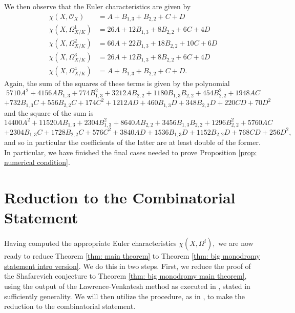 \documentclass{article}
\theoremstyle{definition}
\theoremstyle{remark}
\begin{document}
We then observe that the Euler characteristics are given by \begin{align*}
\chi(X, \mathcal{O}_X) & = A + B_{1, 3} + B_{2, 2} + C + D\\
\chi(X, \Omega^1_{X/K}) & = 26A + 12B_{1, 3} + 8B_{2, 2} + 6C + 4D\\
\chi(X, \Omega^2_{X/K}) & = 66A + 22B_{1, 3} + 18B_{2, 2} + 10C + 6D\\
\chi(X, \Omega^3_{X/K}) & = 26A + 12B_{1, 3} + 8B_{2, 2} + 6C + 4D\\
\chi(X, \Omega^4_{X/K}) & = A + B_{1, 3} + B_{2, 2} + C + D.
\end{align*}
Again, the sum of the squares of these terms is given by the polynomial $$5710A^2 + 4156AB_{1, 3} + 774B_{1, 3}^2 + 3212AB_{2, 2} + 1180B_{1, 3}B_{2, 2} + 454B_{2, 2}^2 + 1948AC$$ $$ + 732B_{1, 3}C + 556B_{2, 2}C + 174C^2 + 1212AD + 460B_{1, 3}D + 348B_{2, 2}D + 220CD + 70D^2$$ and the square of the sum is 
$$14400A^2 + 11520AB_{1, 3} + 2304B_{1, 3}^2 + 8640AB_{2, 2} + 3456B_{1, 3}B_{2, 2} + 1296B_{2, 2}^2 + 5760AC $$ $$+ 2304B_{1, 3}C + 1728B_{2, 2}C + 576C^2 + 3840AD + 1536B_{1, 3}D + 1152B_{2, 2}D + 768CD + 256D^2,$$ and so in particular the coefficients of the latter are at least double of the former. In particular, we have finished the final cases needed to prove Proposition \ref{prop: numerical condition}.
\section{Reduction to the Combinatorial Statement}\label{section: reduce to combinatorics}
Having computed the appropriate Euler characteristics $\chi(X, \Omega^i),$ we are now ready to reduce Theorem \ref{thm: main theorem} to Theorem \ref{thm: big monodromy statement intro version}. We do this in two steps. First, we reduce the proof of the Shafarevich conjecture to Theorem \ref{thm: big monodromy main theorem}, using the output of the Lawrence-Venkatesh method as executed in \cite{km24}, stated in sufficiently generality. We will then utilize the procedure, as in \cite{ls25}, to make the reduction to the combinatorial statement.
\end{document}
